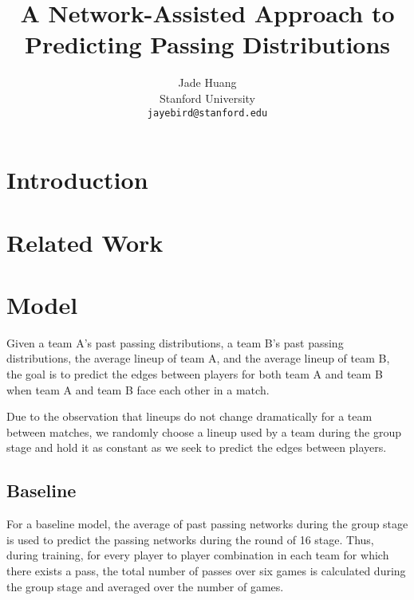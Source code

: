 \documentclass[11pt,letterpaper]{article}
\title{A Network-Assisted Approach to Predicting Passing Distributions}
\author{
  Jade Huang\\
  Stanford University \\
  {\tt jayebird@stanford.edu}}
\date{}
\begin{document}
\maketitle
\begin{abstract}

\end{abstract}

\section{Introduction}

\section{Related Work}

\section{Model}


Given a team A's past passing distributions, a team B's past passing distributions, the average lineup of team A, and the average lineup of team B, the goal is to predict the edges between players for both team A and team B when team A and team B face each other in a match.

Due to the observation that lineups do not change dramatically for a team between matches, we randomly choose a lineup used by a team during the group stage and hold it as constant as we seek to predict the edges between players.

\subsection{Baseline}

For a baseline model, the average of past passing networks during the group stage is used to predict the passing networks during the round of 16 stage. Thus, during training, for every player to player combination in each team for which there exists a pass, the total number of passes over six games is calculated during the group stage and averaged over the number of games. 
\end{document}
